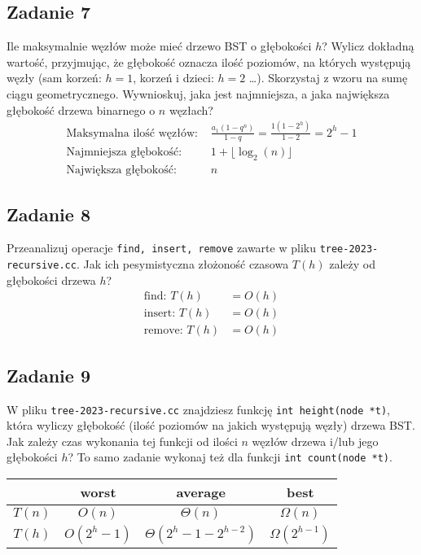 \documentclass{article}
\begin{document}
\subsection*{Zadanie 7}
Ile maksymalnie węzłów może mieć drzewo BST o głębokości $h$? Wylicz dokładną wartość,
przyjmując, że głębokość oznacza ilość poziomów, na których występują węzły (sam
korzeń: $h = 1$, korzeń i dzieci: $h = 2$ \dots ). Skorzystaj z wzoru na sumę ciągu geometrycznego.
Wywnioskuj, jaka jest najmniejsza, a jaka największa głębokość drzewa binarnego o $n$ węzłach?
\begin{align*}
    \text{Maksymalna ilość węzłów: } & \frac{a_1(1-q^n)}{1-q} = \frac{1(1-2^h)}{1-2} = 2^h-1 \\
    \text{Najmniejsza głębokość: }   & 1 + \lfloor \log_2(n) \rfloor                         \\
    \text{Największa głębokość: }    & n
\end{align*}

\subsection*{Zadanie 8}
Przeanalizuj operacje \verb|find, insert, remove| zawarte w pliku \verb|tree-2023-recursive.cc|.
Jak ich pesymistyczna złożoność czasowa $T(h)$ zależy od głębokości drzewa $h$?
\begin{align*}
    \text{find: } T(h)   & = O(h) \\
    \text{insert: } T(h) & = O(h) \\
    \text{remove: } T(h) & = O(h)
\end{align*}

\subsection*{Zadanie 9}
W pliku \verb|tree-2023-recursive.cc| znajdziesz funkcję \verb|int height(node *t)|, która
wyliczy głębokość (ilość poziomów na jakich występują węzły) drzewa BST. Jak zależy czas
wykonania tej funkcji od ilości $n$ węzłów drzewa i/lub jego głębokości $h$? To samo zadanie
wykonaj też dla funkcji \verb|int count(node *t)|.
\begin{center}
    \begin{tabular}{c|c|c|c}
               & worst      & average                   & best              \\
        \hline
        $T(n)$ & $O(n)$     & $\Theta(n)$               & $\Omega(n)$       \\
        $T(h)$ & $O(2^h-1)$ & $\Theta(2^h-1 - 2^{h-2})$ & $\Omega(2^{h-1})$ \\
    \end{tabular}
\end{center}
\end{document}
